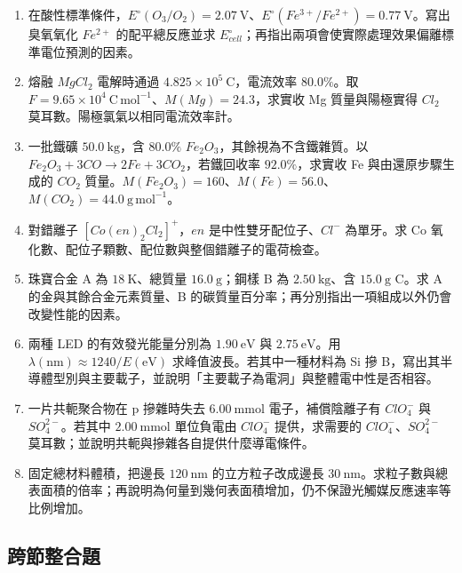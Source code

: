 \documentclass[11pt,a4paper]{article}
\begin{document}
\begin{enumerate}
\def\labelenumi{\arabic{enumi}.}
\setcounter{enumi}{4}
\item
  在酸性標準條件，\(E^\circ(O_3/O_2)=2.07\ \mathrm{V}\)、\(E^\circ(Fe^{3+}/Fe^{2+})=0.77\ \mathrm{V}\)。寫出臭氧氧化 \(Fe^{2+}\) 的配平總反應並求 \(E^\circ_{cell}\)；再指出兩項會使實際處理效果偏離標準電位預測的因素。
\item
  熔融 \(MgCl_2\) 電解時通過 \(4.825\times10^5\ \mathrm{C}\)，電流效率 \(80.0\%\)。取 \(F=9.65\times10^4\ \mathrm{C\,mol^{-1}}\)、\(M(Mg)=24.3\)，求實收 Mg 質量與陽極實得 \(Cl_2\) 莫耳數。陽極氯氣以相同電流效率計。
\item
  一批鐵礦 \(50.0\ \mathrm{kg}\)，含 \(80.0\%\) \(Fe_2O_3\)，其餘視為不含鐵雜質。以 \(Fe_2O_3+3CO\rightarrow2Fe+3CO_2\)，若鐵回收率 \(92.0\%\)，求實收 Fe 與由還原步驟生成的 \(CO_2\) 質量。\(M(Fe_2O_3)=160\)、\(M(Fe)=56.0\)、\(M(CO_2)=44.0\ \mathrm{g\,mol^{-1}}\)。
\item
  對錯離子 \([Co(en)_2Cl_2]^+\)，\(en\) 是中性雙牙配位子、\(Cl^-\) 為單牙。求 Co 氧化數、配位子顆數、配位數與整個錯離子的電荷檢查。
\item
  珠寶合金 A 為 \(18\ \mathrm{K}\)、總質量 \(16.0\ \mathrm{g}\)；鋼樣 B 為 \(2.50\ \mathrm{kg}\)、含 \(15.0\ \mathrm{g}\) C。求 A 的金與其餘合金元素質量、B 的碳質量百分率；再分別指出一項組成以外仍會改變性能的因素。
\item
  兩種 LED 的有效發光能量分別為 \(1.90\ \mathrm{eV}\) 與 \(2.75\ \mathrm{eV}\)。用 \(\lambda(\mathrm{nm})\approx1240/E(\mathrm{eV})\) 求峰值波長。若其中一種材料為 Si 摻 B，寫出其半導體型別與主要載子，並說明「主要載子為電洞」與整體電中性是否相容。
\item
  一片共軛聚合物在 p 摻雜時失去 \(6.00\ \mathrm{mmol}\) 電子，補償陰離子有 \(ClO_4^-\) 與 \(SO_4^{2-}\)。若其中 \(2.00\ \mathrm{mmol}\) 單位負電由 \(ClO_4^-\) 提供，求需要的 \(ClO_4^-\)、\(SO_4^{2-}\) 莫耳數；並說明共軛與摻雜各自提供什麼導電條件。
\item
  固定總材料體積，把邊長 \(120\ \mathrm{nm}\) 的立方粒子改成邊長 \(30\ \mathrm{nm}\)。求粒子數與總表面積的倍率；再說明為何量到幾何表面積增加，仍不保證光觸媒反應速率等比例增加。
\end{enumerate}

\subsection{跨節整合題}\label{ux8de8ux7bc0ux6574ux5408ux984c}
\end{document}
